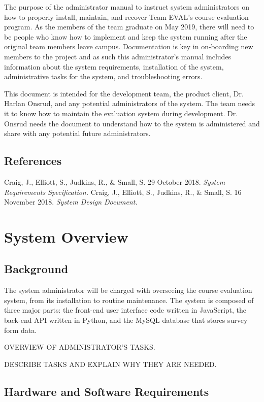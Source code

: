 \documentclass{article}
\begin{document}
The purpose of the administrator manual to instruct system administrators on how to properly install, maintain, and recover Team EVAL's course evaluation program. As the members of the team graduate on May 2019, there will need to be people who know how to implement and keep the system running after the original team members leave campus.  Documentation is key in on-boarding new members to the project and as such this administrator's manual includes information about the system requirements, installation of the system, administrative tasks for the system, and troubleshooting errors.

This document is intended for the development team, the product client, Dr. Harlan Onsrud, and any potential administrators of the system. The team needs it to know how to maintain the evaluation system during development. Dr. Onsrud needs the document to understand how to the system is administered and share with any potential future administrators.

\subsection{References}

Craig, J., Elliott, S., Judkins, R., \& Small, S. 29 October 2018. \textit{System Requirements Specification.}
\vspace{3mm}\newline
Craig, J., Elliott, S., Judkins, R., \& Small, S. 16 November 2018. \textit{System Design Document.}

\section{System Overview}

\subsection{Background}

The system administrator will be charged with overseeing the course evaluation system, from its installation to routine maintenance. The system is composed of three major parts: the front-end user interface code written in JavaScript, the back-end API written in Python, and the MySQL database that stores survey form data. 


OVERVIEW OF ADMINISTRATOR'S TASKS.

DESCRIBE TASKS AND EXPLAIN WHY THEY ARE NEEDED.

\subsection{Hardware and Software Requirements}
\end{document}
